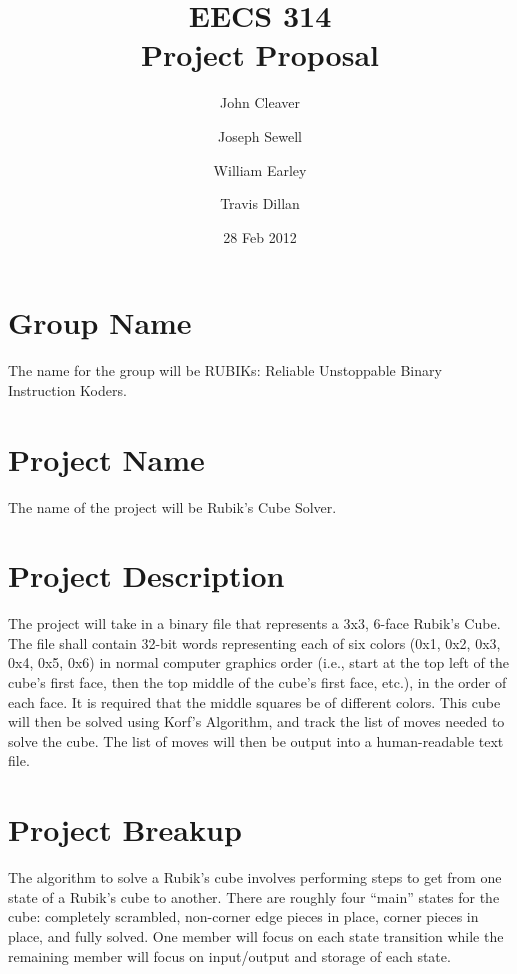 \documentclass{article}
\title{EECS 314 \\ Project Proposal}
\author{John Cleaver \and Joseph Sewell \and William Earley \and Travis Dillan}
\date{28 Feb 2012}
\begin{document}
\maketitle

\section{Group Name}

The name for the group will be RUBIKs: Reliable Unstoppable Binary Instruction Koders.

\section{Project Name}

The name of the project will be Rubik's Cube Solver.

\section{Project Description}

The project will take in a binary file that represents a 3x3, 6-face Rubik's Cube. The file shall contain 32-bit words representing each of six colors (0x1, 0x2, 0x3, 0x4, 0x5, 0x6) in normal computer graphics order (i.e., start at the top left of the cube's first face, then the top middle of the cube’s first face, etc.), in the order of each face. It is required that the middle squares be of different colors. This cube will then be solved using Korf's Algorithm, and track the list of moves needed to solve the cube. The list of moves will then be output into a human-readable text file.

\section{Project Breakup}

The algorithm to solve a Rubik's cube involves performing steps to get from one state of a Rubik's cube to another. There are roughly four ``main'' states for the cube: completely scrambled, non-corner edge pieces in place, corner pieces in place, and fully solved. One member will focus on each state transition while the remaining member will focus on input/output and storage of each state.
\end{document}
